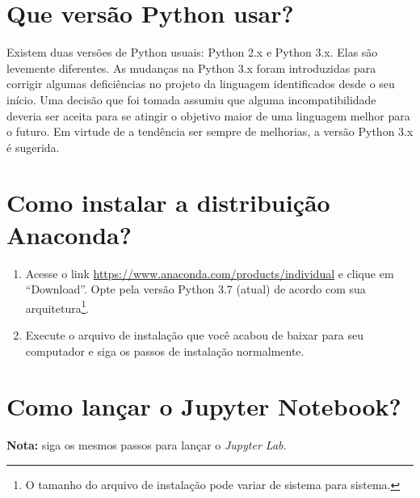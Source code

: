 \documentclass[a4paper,12pt]{article}
\begin{document}
\section*{Que versão Python usar?}

Existem duas versões de Python usuais: Python 2.x e Python 3.x. Elas são
levemente diferentes. As mudanças na Python 3.x foram introduzidas para
corrigir algumas deficiências no projeto da linguagem identificados
desde o seu início. Uma decisão que foi tomada assumiu que alguma
incompatibilidade deveria ser aceita para se atingir o objetivo maior de
uma linguagem melhor para o futuro. Em virtude de a tendência ser sempre
de melhorias, a versão Python 3.x é sugerida.

\section*{Como instalar a distribuição Anaconda?}

\begin{enumerate}
\item
  Acesse o link \url{https://www.anaconda.com/products/individual} e clique em
  ``Download''. Opte pela versão Python 3.7 (atual) de acordo com sua arquitetura\footnote{O tamanho do arquivo de instalação pode variar de sistema para sistema.}.
\item
  Execute o arquivo de instalação que você acabou de baixar para seu
  computador e siga os passos de instalação normalmente.
\end{enumerate}

\section*{Como lançar o Jupyter Notebook?}

\textbf{Nota:} siga os mesmos passos para lançar o \emph{Jupyter Lab}.
\end{document}
